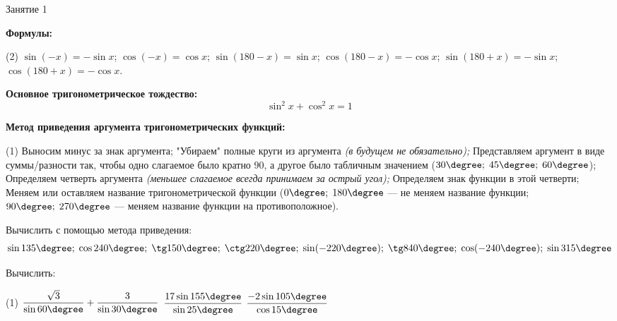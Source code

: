 %
%

\begin{class}[number=1]
	\begin{listofex}
		\item Занятие 1
	\end{listofex}
\end{class}

\begin{class}[number=2]
	\begin{listofex}
		\item \textbf{Формулы:}
		\begin{tasks}(2)
			\task \( \sin(-x) = -\sin x \);
			\task \( \cos(-x) = \cos x \);
			\task \( \sin(180 - x) = \sin x \);
			\task \( \cos(180 - x) = -\cos x \);
			\task \( \sin(180+x) = -\sin x \);
			\task \( \cos(180+x) = -\cos x \).
		\end{tasks}
		 \item \textbf{Основное тригонометрическое тождество:}
		 \[\sin^2x+\cos^2x=1\]
		 \item \textbf{Метод приведения аргумента тригонометрических функций:}
		\begin{tasks}(1)
			\task Выносим минус за знак аргумента;
			\task "Убираем"{ }полные круги из аргумента \textit{(в будущем не обязательно);}
			\task Представляем аргумент в виде суммы/разности так, чтобы одно слагаемое было кратно \( 90 \), а другое было табличным значением (\( 30\degree;\;45\degree;\;60\degree \));
			\task Определяем четверть аргумента \textit{(меньшее слагаемое всегда принимаем за острый угол);}
			\task Определяем знак функции в этой четверти;
			\task Меняем или оставляем название тригонометрической функции (\( 0\degree;\;180\degree \) --- не меняем название функции; \( 90\degree;\;270\degree \) --- меняем название функции на противоположное).
		\end{tasks}
		\item Вычислить с помощью метода приведения:
		\[ \sin135\degree;\;\cos240\degree;\;\tg150\degree;\;\ctg220\degree;\;\sin(-220\degree);\;\tg840\degree;\;\cos(-240\degree);\;\sin315\degree \]
		\item Вычислить:
		\begin{tasks}(1)
			\task \( \dfrac{\sqrt{3}}{\sin60\degree}+\dfrac{3}{\sin30\degree} \)
			\task \( \dfrac{17\sin155\degree}{\sin25\degree} \)
			\task \( \dfrac{-2\sin105\degree}{\cos15\degree} \)

\end{tasks}
\end{listofex}
\end{class}
